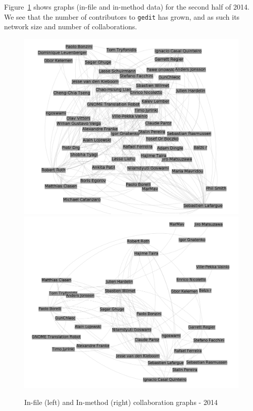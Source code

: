 \documentclass[a4paper]{article}
\begin{document}
Figure~\ref{fig:2014} shows graphs (in-file and in-method data) for the
second half of 2014. We see that the number of contributors to \texttt{gedit}
has grown, and as such its network size and number of collaborations. 

\begin{figure}[h!]
\begin{center}
\includegraphics[scale=0.17]{g2014files.png} 
\includegraphics[scale=0.17]{g2014methods.png}
\caption{In-file (left) and In-method (right) collaboration graphs - 2014}
\label{fig:2014}
\end{center}
\end{figure}
\end{document}
